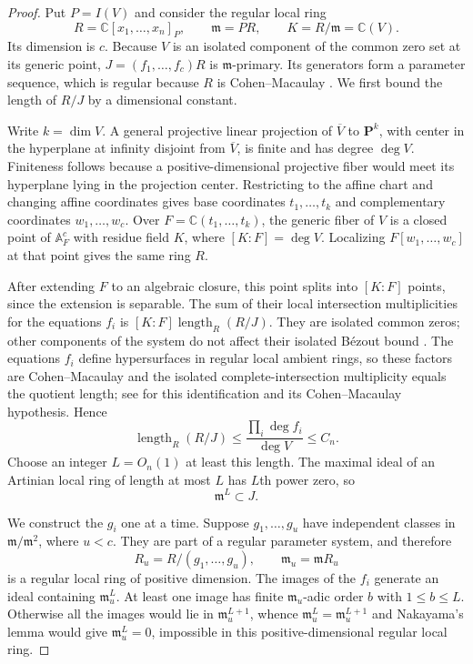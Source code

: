 \begin{proof}
Put $P=I(V)$ and consider the regular local ring
\[
 R=\mathbb{C}[x_1,\ldots,x_n]_P,\qquad
 \mathfrak{m}=PR,\qquad K=R/\mathfrak{m}=\mathbb{C}(V).
\]
Its dimension is $c$.  Because $V$ is an isolated component of the common zero set at its generic point, $J=(f_1,\ldots,f_c)R$ is $\mathfrak{m}$-primary.  Its generators form a parameter sequence, which is regular because $R$ is Cohen--Macaulay \cite[Tags~00OQ, 00NQ, and 02JN]{stacksproject}. We first bound the length of $R/J$ by a dimensional constant.

Write $k=\dim V$.  A general projective linear projection of $\overline V$ to $\mathbf{P}^k$, with center in the hyperplane at infinity disjoint from $\overline V$, is finite and has degree $\deg V$.  Finiteness follows because a positive-dimensional projective fiber would meet its hyperplane lying in the projection center. Restricting to the affine chart and changing affine coordinates gives base coordinates $t_1,\ldots,t_k$ and complementary coordinates $w_1,\ldots,w_c$.  Over $F=\mathbb{C}(t_1,\ldots,t_k)$, the generic fiber of $V$ is a closed point of $\mathbb{A}^c_F$ with residue field $K$, where $[K:F]=\deg V$.  Localizing $F[w_1,\ldots,w_c]$ at that point gives the same ring $R$.

After extending $F$ to an algebraic closure, this point splits into $[K:F]$ points, since the extension is separable.  The sum of their local intersection multiplicities for the equations $f_i$ is $[K:F]\operatorname{length}_R(R/J)$.  They are isolated common zeros; other components of the system do not affect their isolated B\'ezout bound \cite[Theorem~12.3 and Example~12.3.1]{Ful}. The equations $f_i$ define hypersurfaces in regular local ambient rings, so these factors are Cohen--Macaulay and the isolated complete-intersection multiplicity equals the quotient length; see \cite[Example~12.3.7(ii)--(iii)]{Ful} for this identification and its Cohen--Macaulay hypothesis.  Hence
\begin{equation}
 \operatorname{length}_R(R/J)
 \leq\frac{\prod_i\deg f_i}{\deg V}\leq C_n.
 \label{eq:conc-local-length}
\end{equation}
Choose an integer $L=O_n(1)$ at least this length.  The maximal ideal of an Artinian local ring of length at most $L$ has $L$th power zero, so
\begin{equation}
 \mathfrak{m}^L\subset J.
 \label{eq:conc-adic-bound}
\end{equation}

We construct the $g_i$ one at a time.  Suppose $g_1,\ldots,g_u$ have independent classes in $\mathfrak{m}/\mathfrak{m}^2$, where $u<c$. They are part of a regular parameter system, and therefore
\[
 R_u=R/(g_1,\ldots,g_u),\qquad
 \mathfrak{m}_u=\mathfrak{m}R_u
\]
is a regular local ring of positive dimension.  The images of the $f_i$ generate an ideal containing $\mathfrak{m}_u^L$.  At least one image has finite $\mathfrak{m}_u$-adic order $b$ with $1\leq b\leq L$. Otherwise all the images would lie in $\mathfrak{m}_u^{L+1}$, whence $\mathfrak{m}_u^L=\mathfrak{m}_u^{L+1}$ and Nakayama's lemma would give $\mathfrak{m}_u^L=0$, impossible in this positive-dimensional regular local ring.


\end{proof}
